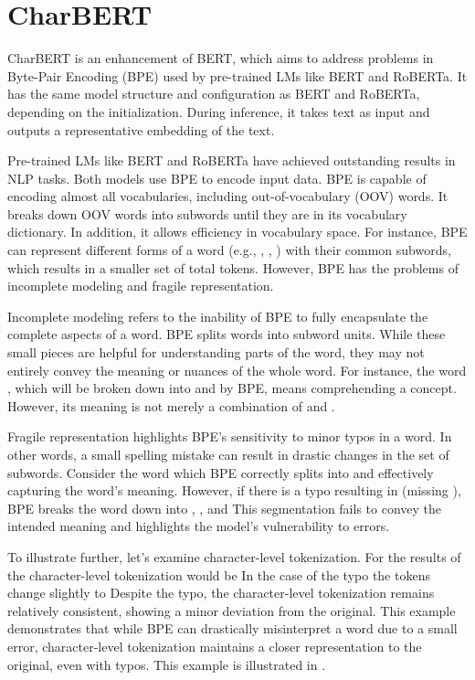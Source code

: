 \section{CharBERT}
\label{sec:2_charbert}
CharBERT \citep{ma-etal-2020-charbert} is an enhancement of BERT, which aims to address problems in Byte-Pair Encoding (BPE) \citep{sennrich2015neural} used by pre-trained LMs like BERT and RoBERTa. It has the same model structure and configuration as BERT and RoBERTa, depending on the initialization. During inference, it takes text as input and outputs a representative embedding of the text.

Pre-trained LMs like BERT and RoBERTa have achieved outstanding results in NLP tasks. Both models use BPE to encode input data. BPE is capable of encoding almost all vocabularies, including out-of-vocabulary (OOV) words. It breaks down OOV words into subwords until they are in its vocabulary dictionary. In addition, it allows efficiency in vocabulary space. For instance, BPE can represent different forms of a word (e.g., , , ) with their common subwords, which results in a smaller set of total tokens. However, BPE has the problems of incomplete modeling and fragile representation.

Incomplete modeling refers to the inability of BPE to fully encapsulate the complete aspects of a word. BPE splits words into subword units. While these small pieces are helpful for understanding parts of the word, they may not entirely convey the meaning or nuances of the whole word. For instance, the word , which will be broken down into  and  by BPE, means comprehending a concept. However, its meaning is not merely a combination of  and .

Fragile representation highlights BPE's sensitivity to minor typos in a word. In other words, a small spelling mistake can result in drastic changes in the set of subwords. Consider the word  which BPE correctly splits into  and  effectively capturing the word's meaning. However, if there is a typo resulting in  (missing ), BPE breaks the word down into , , and  This segmentation fails to convey the intended meaning and highlights the model's vulnerability to errors.

To illustrate further, let's examine character-level tokenization. For  the results of the character-level tokenization would be         In the case of the typo  the tokens change slightly to        Despite the typo, the character-level tokenization remains relatively consistent, showing a minor deviation from the original. This example demonstrates that while BPE can drastically misinterpret a word due to a small error, character-level tokenization maintains a closer representation to the original, even with typos. This example is illustrated in .

